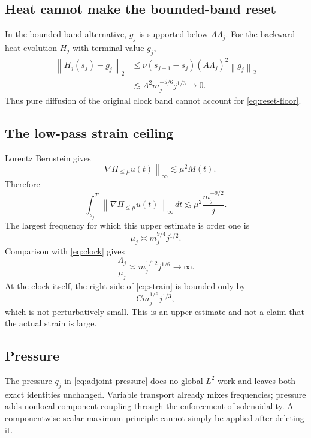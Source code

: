 \documentclass[11pt]{article}
\theoremstyle{remark}
\newcommand{\norm}[1]{\left\|#1\right\|}
\begin{document}
\subsection{Heat cannot make the bounded-band reset}

In the bounded-band alternative, \(g_j\) is supported below
\(A\Lambda_j\).  For the backward heat evolution \(H_j\) with terminal
value \(g_j\),
\begin{align}
 \norm{H_j(s_j)-g_j}_2
 &\leq
 \nu(s_{j+1}-s_j)(A\Lambda_j)^2\norm{g_j}_2
 \nonumber\\
 &\lesssim
 A^2m_j^{-5/6}j^{1/3}
 \longrightarrow0.
 \label{eq:heat-small}
\end{align}
Thus pure diffusion of the original clock band cannot account for
\eqref{eq:reset-floor}.

\subsection{The low-pass strain ceiling}

Lorentz Bernstein gives
\[
 \norm{\nabla\Pi_{\leq\mu}u(t)}_\infty
 \lesssim
 \mu^2M(t).
\]
Therefore
\begin{equation}
 \label{eq:strain}
 \int_{s_j}^T
 \norm{\nabla\Pi_{\leq\mu}u(t)}_\infty\,dt
 \lesssim
 \mu^2\frac{m_j^{-9/2}}{j}.
\end{equation}
The largest frequency for which this upper estimate is order one is
\[
 \mu_j\asymp m_j^{9/4}j^{1/2}.
\]
Comparison with \eqref{eq:clock} gives
\begin{equation}
 \label{eq:strain-gap}
 \boxed{
 \frac{\Lambda_j}{\mu_j}
 \asymp
 m_j^{1/12}j^{1/6}
 \longrightarrow\infty.
 }
\end{equation}
At the clock itself, the right side of \eqref{eq:strain} is bounded only
by
\[
 C m_j^{1/6}j^{1/3},
\]
which is not perturbatively small.  This is an upper estimate and not a
claim that the actual strain is large.

\subsection{Pressure}

The pressure \(q_j\) in \eqref{eq:adjoint-pressure} does no global
\(L^2\) work and leaves both exact identities unchanged.  Variable
transport already mixes frequencies; pressure adds nonlocal component
coupling through the enforcement of solenoidality.  A componentwise
scalar maximum principle cannot simply be applied after deleting it.
\end{document}

